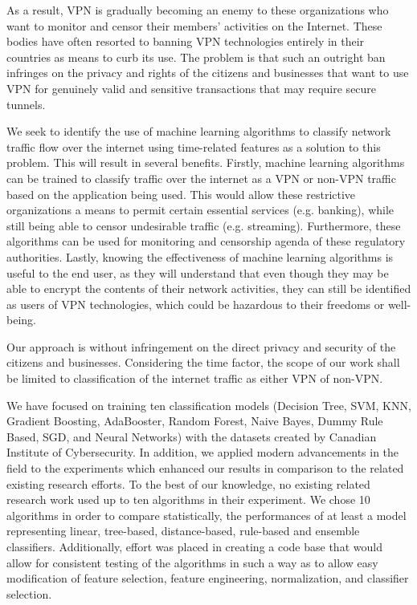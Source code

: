 \documentclass[conference]{IEEEtran}
\begin{document}
As a result, VPN is gradually becoming an enemy to these organizations who want to monitor and censor their members' activities on the Internet. These bodies have often resorted to banning VPN technologies entirely in their countries as means to curb its use. The problem is that such an outright ban infringes on the privacy and rights of the citizens and businesses that want to use VPN for genuinely valid and sensitive transactions that may require secure tunnels.

We seek to identify the use of machine learning algorithms to classify network traffic flow over the internet using time-related features as a solution to this problem. This will result in several benefits. Firstly, machine learning algorithms can be trained to classify traffic over the internet as a VPN or non-VPN traffic based on the application being used. This would allow these restrictive organizations a means to permit certain essential services (e.g. banking), while still being able to censor undesirable traffic (e.g. streaming). Furthermore, these algorithms can be used for monitoring and censorship agenda of these regulatory authorities. Lastly, knowing the effectiveness of machine learning algorithms is useful to the end user, as they will understand that even though they may be able to encrypt the contents of their network activities, they can still be identified as users of VPN technologies, which could be hazardous to their freedoms or well-being.

Our approach is without infringement on the direct privacy and security of the citizens and businesses. Considering the time factor, the scope of our work shall be limited to classification of the internet traffic as either VPN of non-VPN.

We have focused on training ten classification models (Decision Tree, SVM, KNN, Gradient Boosting, AdaBooster, Random Forest, Naive Bayes, Dummy Rule Based, SGD, and Neural Networks) with the datasets created by Canadian Institute of Cybersecurity. In addition, we applied modern advancements in the field to the experiments which enhanced our results in comparison to the related existing research efforts. To the best of our knowledge, no existing related research work used up to ten algorithms in their experiment. We chose 10 algorithms in order to compare statistically, the performances of at least a model representing linear, tree-based, distance-based, rule-based and ensemble classifiers. Additionally, effort was placed in creating a code base that would allow for consistent testing of the algorithms in such a way as to allow easy modification of feature selection, feature engineering, normalization, and classifier selection.
\end{document}
